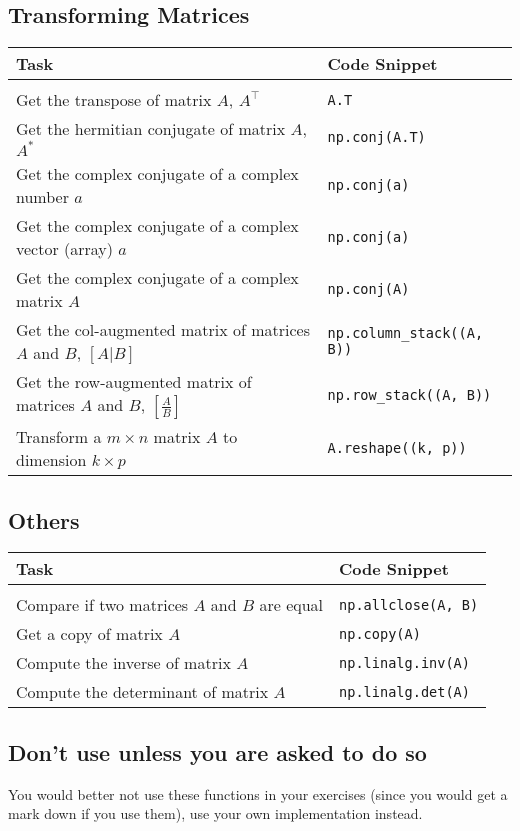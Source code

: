\documentclass[a4paper,11pt]{article}
\begin{document}
\subsection*{Transforming Matrices}
\begin{tabular}{p{10cm} |p{5cm}}
  Task & Code Snippet \\
  \hline \\
Get the transpose of matrix $A$,  $A^{\top}$ & \texttt{A.T} \\
Get the hermitian conjugate of matrix $A$,  $A^{*}$ & \texttt{np.conj(A.T)} \\
Get the complex conjugate of a complex number $a$ & \texttt{np.conj(a)}\\
Get the complex conjugate of a complex vector (array) $a$ &  \texttt{np.conj(a)}\\
Get the complex conjugate of a complex matrix $A$ &  \texttt{np.conj(A)} \\
Get the col-augmented matrix of matrices \(A\) and \(B\), \([A | B]\) & \texttt{np.column\_stack((A, B))} \\
Get the row-augmented matrix of matrices \(A\) and \(B\), \([\frac{A}{B}]\) & \texttt{np.row\_stack((A, B))} \\
Transform a \(m \times  n\) matrix \(A\)  to dimension \(k \times  p\) & \texttt{A.reshape((k, p))} 
\end{tabular}
\subsection*{Others}
\begin{tabular}{p{10cm} |p{5cm}}
  Task & Code Snippet \\
  \hline \\
  Compare if two matrices \(A\) and \(B\) are equal & \texttt{np.allclose(A, B)} \\
  Get a copy of matrix \(A\)  & \texttt{np.copy(A)} \\
  Compute the inverse of matrix \(A\) & \texttt{np.linalg.inv(A)} \\
  Compute the determinant of matrix \(A\) & \texttt{np.linalg.det(A)} 
\end{tabular}

\subsection*{Don't use unless you are asked to do so}
You would better not use these functions in your exercises (since you would get a mark down if you use them), use your own implementation instead. \medskip
\end{document}
